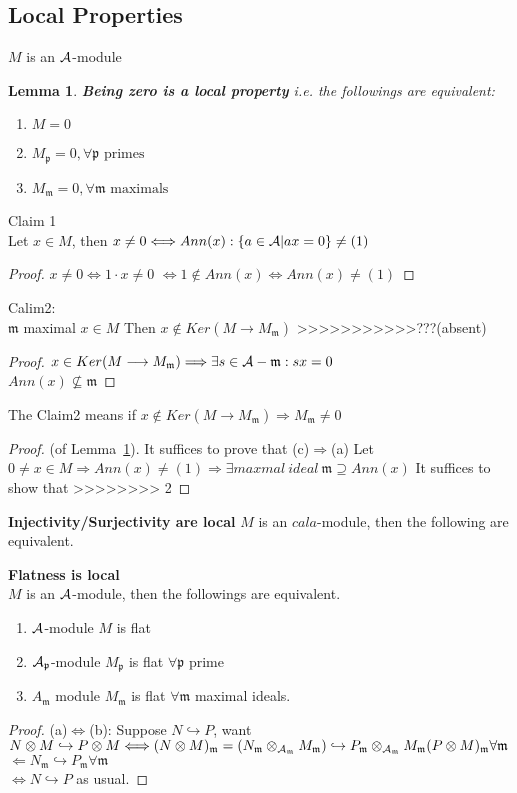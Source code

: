 \documentclass[11pt]{article}
\newtheorem{lemma}[thm]{Lemma}
\newcommand{\scm}{{\mathfrak m}}
\newcommand{\scp}{{\mathfrak p}}
\newcommand{\cala}{{\cal A}}
\newcommand{\Lrta}{\Longrightarrow}
\newcommand{\lrta}{\longrightarrow}
\newcommand{\Llrta}{\Longleftrightarrow}
\newcommand{\inj}{\hookrightarrow}
\begin{document}
\subsection*{Local Properties}
$M$ is an $\cala$-module
\begin{lemma}\label{lem:zerpo_local}
\textbf{Being zero is a local property} i.e. the followings are equivalent:
\begin{enumerate}[label=(\alph*)]
\item $M=0$
\item $M_\scp=0,\forall \scp \text{ primes }$
\item $M_\scm=0,\forall \scm \text{ maximals}$
\end{enumerate}
\end{lemma}
Claim 1\\
Let $x\in M$, then $x\neq 0\Longleftrightarrow Ann(x):\{a\in\cala|ax=0\}\neq (1)$
\begin{proof}
$x\neq 0\Llrta 1\cdot x\neq 0$ $\Llrta 1\notin Ann(x)\Llrta Ann(x)\neq (1)$
\end{proof}

Calim2:\\
$\scm$ maximal $x\in M$
Then $x\not\in Ker(M\lrta M_\scm)$ 
>>>>>>>>>>>???(absent)

\begin{proof}
$x\in Ker(M\lrta M_\scm)\Lrta \exists s\in \cala-\scm: sx=0$\\
$Ann(x)\not \subseteq \scm$
\end{proof}
The Claim2 means if $x\notin Ker(M\lrta M_\scm)\Lrta M_\scm\neq 0$

\begin{proof}
(of Lemma~\ref{lem:zerpo_local}).
It suffices to prove that (c)$\Lrta$(a)
Let $0\neq x\in M\Lrta Ann(x)\neq (1)\Lrta \exists maxmal\ ideal\ \scm\supseteq Ann(x)$
It suffices to show that 
>>>>>>>> 2
\end{proof}

\textbf{Injectivity/Surjectivity are local}
$M$ is an $cala$-module, then the following are equivalent.

\textbf{Flatness is local}\\
$M$ is an $\cala$-module, then the followings are equivalent.
\begin{enumerate}[label=(\alph*)]
\item $\cala$-module $M$ is flat
\item $\cala_\scp$-module $M_\scp$ is flat $\forall \scp$ prime
\item $A_\scm$ module $M_\scm$ is flat $\forall \scm$ maximal ideals.
\end{enumerate}
\begin{proof}
(a)$\Llrta$(b): Suppose $N\inj P$, want $N\otimes M\inj P\otimes M\Llrta (N\otimes M)_\scm=(N_\scm\otimes_{\cala_\scm}M_\scm)\inj P_\scm\otimes_{\cala_\scm} M_\scm (P\otimes M)_\scm\forall \scm$ \\
$\Longleftarrow N_\scm\inj P_\scm\forall \scm$\\
$\Llrta N\inj P$ as usual.
\end{proof}
\end{document}

